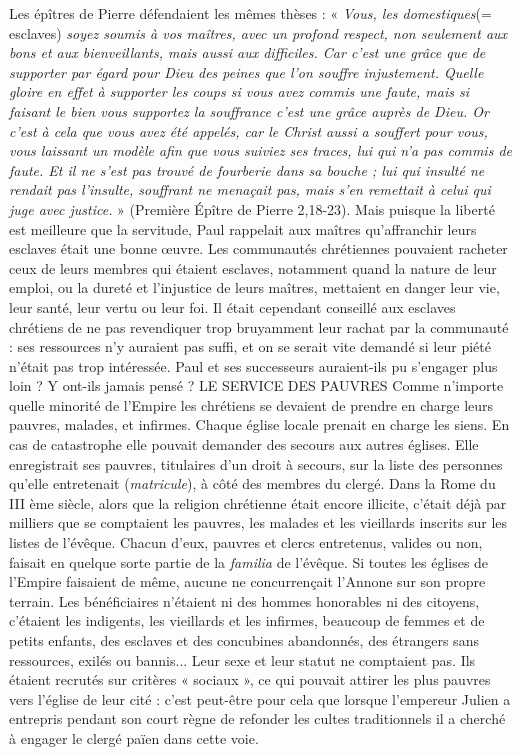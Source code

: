  Les épîtres de Pierre défendaient les mêmes thèses : « \emph{Vous, les domestiques}(= esclaves)\emph{ soyez soumis à vos maîtres, avec un profond respect, non seulement aux bons et aux bienveillants, mais aussi aux difficiles. Car c'est une grâce que de supporter par égard pour Dieu des peines que l'on souffre injustement. Quelle gloire en effet à supporter les coups si vous avez commis une faute, mais si faisant le bien vous supportez la souffrance c'est une grâce auprès de Dieu. Or c'est à cela que vous avez été appelés, car le Christ aussi a souffert pour vous, vous laissant un modèle afin que vous suiviez ses traces, lui qui n'a pas commis de faute. Et il ne s'est pas trouvé de fourberie dans sa bouche ; lui qui insulté ne rendait pas l'insulte, souffrant ne menaçait pas, mais s'en remettait à celui qui juge avec justice.} » (Première Épître de Pierre 2,18-23). 
 Mais puisque la liberté est meilleure que la servitude, Paul rappelait aux maîtres qu'affranchir leurs esclaves était une bonne œuvre. Les communautés chrétiennes pouvaient racheter ceux de leurs membres qui étaient esclaves, notamment quand la nature de leur emploi, ou la dureté et l'injustice de leurs maîtres, mettaient en danger leur vie, leur santé, leur vertu ou leur foi. Il était cependant conseillé aux esclaves chrétiens de ne pas revendiquer trop bruyamment leur rachat par la communauté : ses ressources n'y auraient pas suffi, et on se serait vite demandé si leur piété n'était pas trop intéressée.
 Paul et ses successeurs auraient-ils pu s'engager plus loin ? Y ont-ils jamais pensé ? 
LE SERVICE DES PAUVRES
 Comme n'importe quelle minorité de l'Empire les chrétiens se devaient de prendre en charge leurs pauvres, malades, et infirmes. Chaque église locale prenait en charge les siens. En cas de catastrophe elle pouvait demander des secours aux autres églises. Elle enregistrait ses pauvres, titulaires d'un droit à secours, sur la liste des personnes qu'elle entretenait (\emph{matricule}), à côté des membres du clergé. Dans la Rome du III ème siècle, alors que la religion chrétienne était encore illicite, c'était déjà par milliers que se comptaient les pauvres, les malades et les vieillards inscrits sur les listes de l'évêque. Chacun d'eux, pauvres et clercs entretenus, valides ou non, faisait en quelque sorte partie de la \emph{familia} de l'évêque. 
 Si toutes les églises de l'Empire faisaient de même, aucune ne concurrençait l'Annone sur son propre terrain. Les bénéficiaires n'étaient ni des hommes honorables ni des citoyens, c'étaient les indigents, les vieillards et les infirmes, beaucoup de femmes et de petits enfants, des esclaves et des concubines abandonnés, des étrangers sans ressources, exilés ou bannis... Leur sexe et leur statut ne comptaient pas. Ils étaient recrutés sur critères « sociaux », ce qui pouvait attirer les plus pauvres vers l'église de leur cité : c'est peut-être pour cela que lorsque l'empereur Julien a entrepris pendant son court règne de refonder les cultes traditionnels il a cherché à engager le clergé païen dans cette voie.

